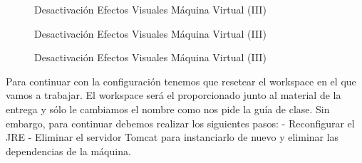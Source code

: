 \documentclass{scrartcl}
\begin{document}
\begin{figure}[H]
	
	\centering
	\caption{Desactivación Efectos Visuales Máquina Virtual (III)}
	\label{fig:ConfEcl04}
	
\end{figure}
\begin{figure}[H]
	
	\centering
	\caption{Desactivación Efectos Visuales Máquina Virtual (III)}
	\label{fig:ConfEcl05}
	
\end{figure}

\begin{figure}[H]
	
	\centering
	\caption{Desactivación Efectos Visuales Máquina Virtual (III)}
	\label{fig:ConfEcl06}
	
\end{figure}
Para continuar con la configuración tenemos que resetear el workspace en el que vamos a trabajar. El workspace será el proporcionado junto al material de la entrega y sólo le cambiamos el nombre como nos pide la guía de clase. Sin embargo, para continuar debemos realizar los siguientes pasos:
- Reconfigurar el JRE
- Eliminar el servidor Tomcat para instanciarlo de nuevo y eliminar las dependencias de la máquina.	
\end{document}
